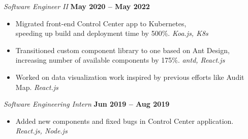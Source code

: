 \documentclass[margin]{resume}
\begin{document}
   \textsl{Software Engineer II} \hfill \textbf{May 2020 -- May 2022}

\begin{itemize}
\item Migrated front-end Control Center app to Kubernetes, \\speeding up build and deployment time by 500\%. \phantom{invisible} \hfill \textit{Koa.js, K8s}
\item Transitioned custom component library to one based on Ant Design, \\increasing number of available components by 175\%. \hfill \textit{antd, React.js}
\item Worked on data visualization work inspired by previous efforts like Audit Map. \hfill \textit{React.js}
\end{itemize}    


    \textsl{Software Engineering Intern} \hfill \textbf{Jun 2019 -- Aug 2019}

\begin{itemize}
\item Added new components and fixed bugs in Control Center application. \hfill \textit{React.js, Node.js}
\end{itemize}





\end{document}
